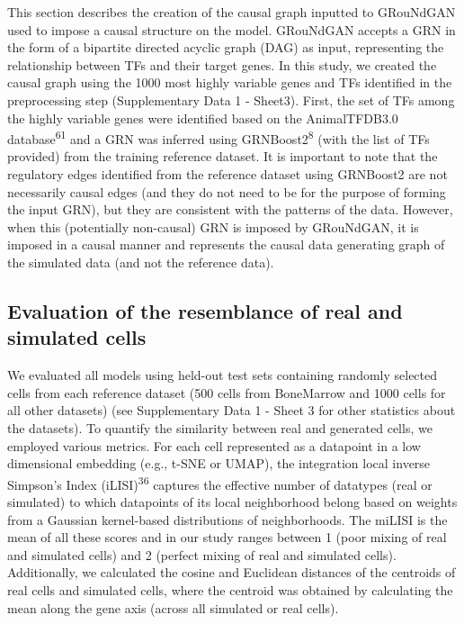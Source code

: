 This section describes the creation of the causal graph inputted to GRouNdGAN used to impose a causal structure on the model. GRouNdGAN accepts a GRN in the form of a bipartite directed acyclic graph (DAG) as input, representing the relationship between TFs and their target genes. In this study, we created the causal graph using the 1000 most highly variable genes and TFs identified in the preprocessing step (Supplementary Data 1 - Sheet3). First, the set of TFs among the highly variable genes were identified based on the AnimalTFDB3.0 database\textsuperscript{61} and a GRN was inferred using GRNBoost2\textsuperscript{8} (with the list of TFs provided) from the training reference dataset. It is important to note that the regulatory edges identified from the reference dataset using GRNBoost2 are not necessarily causal edges (and they do not need to be for the purpose of forming the input GRN), but they are consistent with the patterns of the data. However, when this (potentially non-causal) GRN is imposed by GRouNdGAN, it is imposed in a causal manner and represents the causal data generating graph of the simulated data (and not the reference data).

\subsection*{Evaluation of the resemblance of real and simulated cells}

We evaluated all models using held-out test sets containing randomly selected cells from each reference dataset (500 cells from BoneMarrow and 1000 cells for all other datasets) (see Supplementary Data 1 - Sheet 3 for other statistics about the datasets). To quantify the similarity between real and generated cells, we employed various metrics. For each cell represented as a datapoint in a low dimensional embedding (e.g., t-SNE or UMAP), the integration local inverse Simpson’s Index (iLISI)\textsuperscript{36} captures the effective number of datatypes (real or simulated) to which datapoints of its local neighborhood belong based on weights from a Gaussian kernel-based distributions of neighborhoods. The miLISI is the mean of all these scores and in our study ranges between 1 (poor mixing of real and simulated cells) and 2 (perfect mixing of real and simulated cells). Additionally, we calculated the cosine and Euclidean distances of the centroids of real cells and simulated cells, where the centroid was obtained by calculating the mean along the gene axis (across all simulated or real cells).

